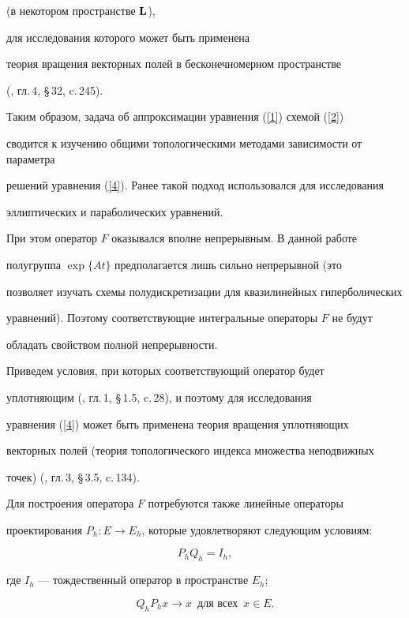 (в некотором пространстве ${\bold L}$),


для исследования которого может быть применена


теория вращения векторных полей в бесконечномерном пространстве 


(\cite{2}, гл.\,4, \S\,32, c.\,245).


Таким образом, задача об аппроксимации уравнения (\ref{1}) схемой (\ref{2})


сводится к изучению общими топологическими методами зависимости от параметра


решений уравнения (\ref{4}). Ранее такой подход использовался для исследования 


эллиптических \cite{3} и параболических \cite{4} уравнений.


При этом оператор $F$ оказывался вполне непрерывным. В данной работе


полугруппа $\exp\{ At \}$ предполагается лишь сильно непрерывной (это 


позволяет изучать схемы полудискретизации для квазилинейных гиперболических


уравнений). Поэтому соответствующие интегральные операторы $F$ не будут 


обладать свойством полной непрерывности.


Приведем условия, при которых соответствующий оператор будет 


уплотняющим (\cite{5}, гл.\,1, \S\,1.5, c.\,28), и поэтому для исследования 


уравнения (\ref{4}) может быть применена теория вращения уплотняющих


векторных полей (теория топологического индекса множества неподвижных


точек) (\cite{5}, гл.\,3, \S\,3.5, c.\,134).





Для построения оператора $F$ потребуются также линейные операторы


проектирования $P_h : E \to E_h$, которые удовлетворяют следующим условиям: 


\begin{equation}\label{5}


P_h Q_h =I_h,


\end{equation}


где $I_h$ --- тождественный оператор в пространстве $E_h$;


\begin{equation}\label{6}


Q_h P_h x \to x \ \; \text{для  всех}\ \; x\in E.


\end{equation}


